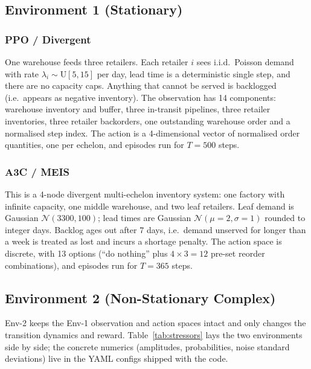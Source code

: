 \documentclass[letterpaper]{article} %
\begin{document}
\subsection{Environment 1 (Stationary)}

\subsubsection{PPO / Divergent}
One warehouse feeds three retailers.  Each retailer $i$ sees
i.i.d.\ Poisson demand with rate
$\lambda_i\sim\mathrm{U}[5,15]$ per day, lead time is a
deterministic single step, and there are no capacity caps.
Anything that cannot be served is backlogged (i.e.\ appears as
negative inventory).  The observation has 14 components: warehouse
inventory and buffer, three in-transit pipelines, three retailer
inventories, three retailer backorders, one outstanding warehouse
order and a normalised step index.  The action is a 4-dimensional
vector of normalised order quantities, one per echelon, and
episodes run for $T{=}500$ steps.

\subsubsection{A3C / MEIS}
This is a 4-node divergent multi-echelon inventory system: one
factory with infinite capacity, one middle warehouse, and two
leaf retailers.  Leaf demand is Gaussian
$\mathcal{N}(3300,100)$; lead times are Gaussian
$\mathcal{N}(\mu{=}2,\sigma{=}1)$ rounded to integer days.
Backlog ages out after 7 days, i.e.\ demand unserved for longer
than a week is treated as lost and incurs a shortage penalty.
The action space is discrete, with 13 options (``do nothing''
plus $4{\times}3{=}12$ pre-set reorder combinations), and episodes
run for $T{=}365$ steps.

\subsection{Environment 2 (Non-Stationary Complex)}
Env-2 keeps the Env-1 observation and action spaces intact and
only changes the transition dynamics and reward.
Table~\ref{tab:stressors} lays the two environments side by side;
the concrete numerics (amplitudes, probabilities, noise standard
deviations) live in the YAML configs shipped with the code.
\end{document}
